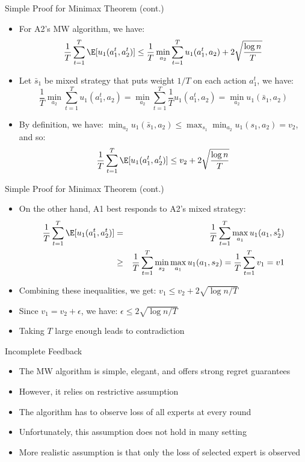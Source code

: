 \documentclass[11pt,aspectratio=169,handout]{beamer}
\begin{document}
  
  \begin{frame}{Simple Proof for Minimax Theorem (cont.)}
   \begin{itemize}[<+->]\small
    \item For A2's MW algorithm, we have:
    \[\frac{1}{T} \sum_{t=1}^T \E[u_1(a_1^t,a_2^t)] \le \frac{1}{T} \min_{a_2} \sum_{t=1}^T u_1(a_1^t,a_2) + 2\sqrt{\frac{\log n}{T}}\]
    \item Let $\bar{s}_1$ be mixed strategy that puts weight $1/T$ on each action $a_1^t$, we have:
    \[\frac{1}{T} \min_{a_2} \sum_{t=1}^T u_1(a_1^t,a_2) = \min_{a_2} \sum_{t=1}^T \frac{1}{T} u_1(a_1^t,a_2) = \min_{a_2} u_1(\bar{s}_1, a_2)\]
    \item By definition, we have: $\min_{a_2} u_1(\bar{s}_1, a_2) \le \max_{s_1} \min_{a_2} u_1(s_1, a_2) = v_2$, and so:
    \[\frac{1}{T} \sum_{t=1}^T \E[u_1(a_1^t,a_2^t)] \le v_2 + 2\sqrt{\frac{\log n}{T}}\]
   \end{itemize}
  \end{frame}
  
  
  \begin{frame}{Simple Proof for Minimax Theorem (cont.)}
   \begin{itemize}[<+->]
    \item On the other hand, A1 best responds to A2's mixed strategy:
    \begin{eqnarray*}
     \frac{1}{T}\sum_{t=1}^T\E[u_1(a_1^t,a_2^t)] & = & \frac{1}{T}\sum_{t=1}^T \max_{a_1}u_1(a_1,s_2^t) \\
     & \geq & \frac{1}{T}\sum_{t=1}^T \min_{s_2} \max_{a_1} u_1(a_1,s_2) = \frac{1}{T}\sum_{t=1}^T v_1 = v1\\
    \end{eqnarray*}
    \item Combining these inequalities, we get: $v_1 \leq v_2 + 2\sqrt{\log n/T}$
    \item Since $v_1 = v_2 + \epsilon$, we have: $\epsilon \leq 2\sqrt{\log n/T}$
    \item Taking $T$ large enough leads to contradiction
   \end{itemize}
  \end{frame}

 \begin{frame}{Incomplete Feedback}
  \begin{itemize}[<+->]
   \item The MW algorithm is simple, elegant, and offers strong regret guarantees
   \item However, it relies on \alert{restrictive} assumption
   \item The algorithm has to observe loss of \alert{all} experts at every round
   \item Unfortunately, this assumption does not hold in many setting
   \item More realistic assumption is that \alert{only} the loss of \alert{selected expert} is observed
  \end{itemize}
 \end{frame}
\end{document}
